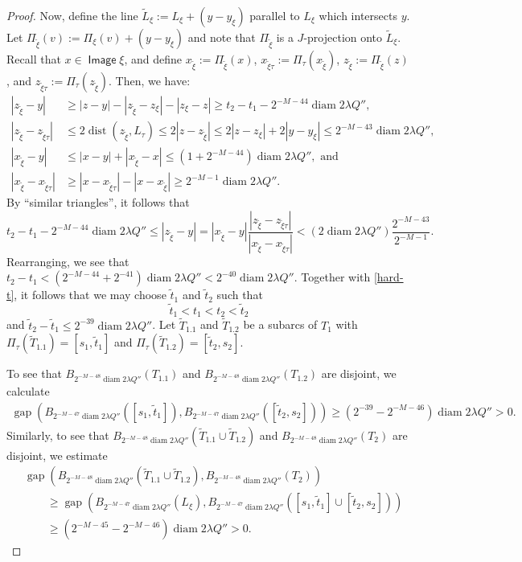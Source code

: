 \documentclass[12pt]{amsart}
\numberwithin{equation}{section}
\theoremstyle{plain}
\theoremstyle{definition}
\newcommand{\diam}{\mathop\mathrm{diam}\nolimits}
\newcommand{\dist}{\mathop\mathrm{dist}\nolimits}
\newcommand{\Image}{\mathop\mathsf{Image}\nolimits}
\newcommand{\gap}{\mathop\mathrm{gap}\nolimits}
\numberwithin{figure}{section}
\begin{document}
\begin{proof}
Now, define the line $\tilde L_\xi:= L_{\xi} + (y- y_{\xi})$ parallel to $L_{\xi}$ which intersects $y$. Let $\Pi_{\tilde{\xi}}(v):= \Pi_{\xi}(v) + (y-y_{\xi})$ and note that $\Pi_{\tilde{\xi}}$ is a $J$-projection onto $\tilde L_{\xi}$.  Recall that $x \in \Image \xi$, and define $x_{\tilde{\xi}}:=\Pi_{\tilde{\xi}}(x)$, $x_{\tilde{\xi}\tau}:=\Pi_{\tau}(x_{\tilde{\xi}})$, $z_{\tilde{\xi}}:=\Pi_{\tilde{\xi}}(z)$, and $z_{\tilde{\xi}\tau}:=\Pi_{\tau}(z_{\tilde{\xi}})$. Then, we have: \begin{align}
|z_{\tilde{\xi}}-y| & \geq |z-y| - |z_{\tilde{\xi}}-z_{\xi}| - |z_{\xi}-z|\ge   t_2-t_1 -2^{-M-44}\diam 2\lambda Q'',\\
|z_{\tilde{\xi}}-z_{\tilde{\xi}\tau}| & \leq 2\dist(z_{\tilde{\xi}}, L_\tau) \leq 2|z-z_{\tilde{\xi}}| \le 2|z-z_{\xi}| + 2|y - y_{\xi}| \leq 2^{-M-43}\diam 2\lambda Q'', \\
|x_{\tilde{\xi}}-y| &\leq |x-y|+|x_{\tilde{\xi}}-x|\leq (1 +2^{-M-44})\diam 2\lambda Q'',\text{ and}\\
|x_{\tilde{\xi}}-x_{\tilde{\xi}\tau}| & \geq |x-x_{\tilde{\xi}\tau}|-|x-x_{\tilde{\xi}}| \geq 2^{-M-1}\diam 2\lambda Q''.\end{align} By ``similar triangles'', it follows that $$t_2-t_1 - 2^{-M-44}\diam 2\lambda Q''\leq |z_{\tilde{\xi}}-y| = |x_{\tilde{\xi}}-y|\frac{|z_{\tilde{\xi}}- z_{\tilde{\xi}\tau}|}{|x_{\tilde{\xi}}-x_{\tilde{\xi}\tau}|} <
(2\diam 2\lambda Q'')\frac{2^{-M-43}}{2^{-M-1}}.$$ Rearranging, we see that $t_2-t_1<(2^{-M-44}+2^{-41})\diam 2\lambda Q''< 2^{-40}\diam 2\lambda Q''.$ Together with \eqref{hard-t}, it follows that we may choose $\tilde t_1$ and $\tilde t_2$ such that $$\tilde t_1<t_1<t_2<\tilde t_2$$ and $\tilde t_2-\tilde t_1 \le 2^{-39}\diam 2\lambda Q''$. Let $\tilde T_{1.1}$ and $\tilde T_{1.2}$ be a subarcs of $T_1$ with $\Pi_\tau(\tilde T_{1.1})=[s_1,\tilde t_1]$ and $\Pi_\tau(\tilde T_{1.2})=[\tilde t_2,s_2]$.

To see that $B_{2^{-M-48}\diam 2\lambda Q''}(T_{1.1})$ and $B_{2^{-M-48}\diam 2\lambda Q''}(T_{1.2})$ are disjoint, we calculate
\begin{align*}
    \gap(B_{2^{-M-47}\diam 2\lambda Q''}([s_1, \tilde t_1]), B_{2^{-M-47}\diam 2\lambda Q''}([\tilde t_2, s_2])) \ge (2^{-39} - 2^{-M-46}) \diam 2\lambda Q''>0.
\end{align*}
Similarly, to see that $B_{2^{-M-48}\diam 2\lambda Q''}(\tilde T_{1.1}\cup \tilde T_{1.2})$ and $B_{2^{-M-48}\diam 2\lambda Q''}(T_2)$ are disjoint, we estimate
\begin{align*}
    & \gap(B_{2^{-M-48}\diam 2\lambda Q''}(\tilde T_{1.1}\cup \tilde T_{1.2}), B_{2^{-M-48}\diam 2\lambda Q''}(T_2))\\
    & \qquad \ge \gap(B_{2^{-M-47}\diam 2\lambda Q''}(L_{\xi}), B_{2^{-M-47}\diam 2\lambda Q''}([s_1 , \tilde t_1] \cup [\tilde t_2, s_2]))\\
    & \qquad \ge (2^{-M-45} - 2^{-M-46})\diam 2\lambda Q'' > 0.
\end{align*}


\end{proof}
\end{document}
